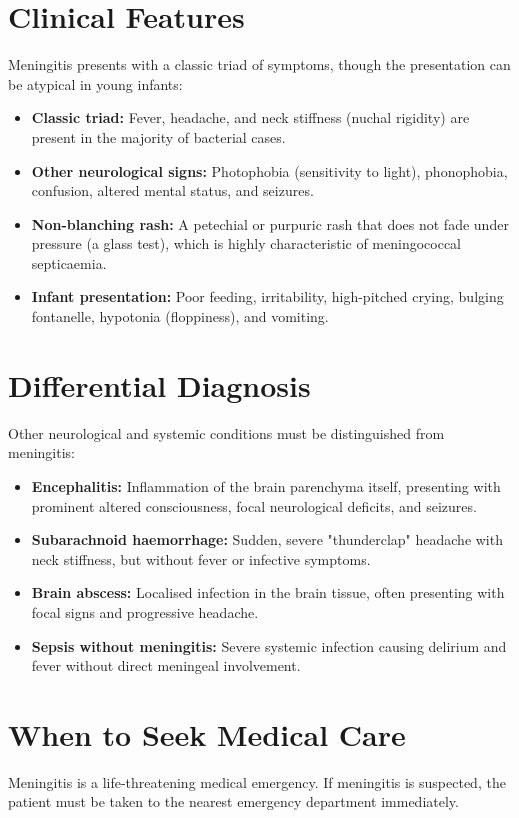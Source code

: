 \section*{Clinical Features}
Meningitis presents with a classic triad of symptoms, though the presentation can be atypical in young infants:

\begin{itemize}
    \item \textbf{Classic triad:} Fever, headache, and neck stiffness (nuchal rigidity) are present in the majority of bacterial cases.
    \item \textbf{Other neurological signs:} Photophobia (sensitivity to light), phonophobia, confusion, altered mental status, and seizures.
    \item \textbf{Non-blanching rash:} A petechial or purpuric rash that does not fade under pressure (a glass test), which is highly characteristic of meningococcal septicaemia.
    \item \textbf{Infant presentation:} Poor feeding, irritability, high-pitched crying, bulging fontanelle, hypotonia (floppiness), and vomiting.
\end{itemize}

\section*{Differential Diagnosis}
Other neurological and systemic conditions must be distinguished from meningitis:

\begin{itemize}
    \item \textbf{Encephalitis:} Inflammation of the brain parenchyma itself, presenting with prominent altered consciousness, focal neurological deficits, and seizures.
    \item \textbf{Subarachnoid haemorrhage:} Sudden, severe "thunderclap" headache with neck stiffness, but without fever or infective symptoms.
    \item \textbf{Brain abscess:} Localised infection in the brain tissue, often presenting with focal signs and progressive headache.
    \item \textbf{Sepsis without meningitis:} Severe systemic infection causing delirium and fever without direct meningeal involvement.
\end{itemize}

\section*{When to Seek Medical Care}
Meningitis is a life-threatening medical emergency. If meningitis is suspected, the patient must be taken to the nearest emergency department immediately.

